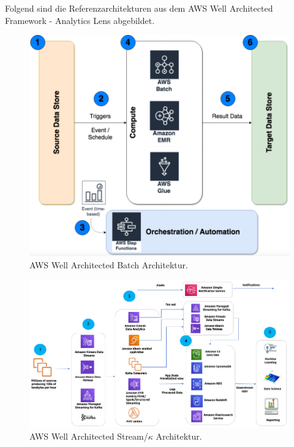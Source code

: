 Folgend sind die Referenzarchitekturen aus dem \ac{AWS} Well Architected Framework - Analytics Lens abgebildet.
\begin{figure}[H]
\centering
\includegraphics[width=\textwidth]{graphics/AWS-Batch-Architecture.pdf}
\caption[AWS Well Architected Batch Architektur]{AWS Well Architected Batch Architektur.\footnotemark}
\label{abb:AWSWellArchitectedBatch}
\end{figure}

\begin{figure}[H]
\centering
\includegraphics[width=0.92\textheight,angle=90,origin=c]{graphics/AWS-Stream-Architecture.pdf}
\caption[AWS Well Architected Stream/$\kappa$ Architektur]{AWS Well Architected Stream/$\kappa$ Architektur.\footnotemark}
\label{abb:AWSWellArchitectedStream}
\end{figure}

